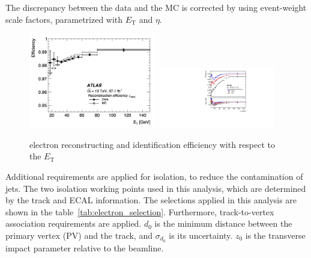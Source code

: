 The discrepancy between the data and the MC is corrected by using event-weight scale factors, parametrized with $E_\mathrm{T}$ and $\eta$.
\begin{figure}[tbp]
\begin{center}
 \includegraphics[width=0.50\textwidth,keepaspectratio]{figures/Reconstruction/recoElectron}
 \includegraphics[width=0.45\textwidth,keepaspectratio]{figures/Reconstruction/idElectron}
\caption{
electron reconstructing and identification efficiency with respect to the $E_\mathrm{T}$
}
\label{fig:recoElectron}
\end{center}
\end{figure}
Additional requirements are applied for isolation, to reduce the contamination of jets. 
The two isolation working points used in this analysis, which are determined by the track and ECAL information. 
The selections applied in this analysis are shown in the table~\ref{tab:electron_selection}.
Furthermore, track-to-vertex association requirements are applied. 
$d_0$ is the minimum distance between the primary vertex (PV) and the track, and $\sigma_{d_0}$ is its uncertainty. $z_0$ is the transverse impact parameter relative to the beamline.
